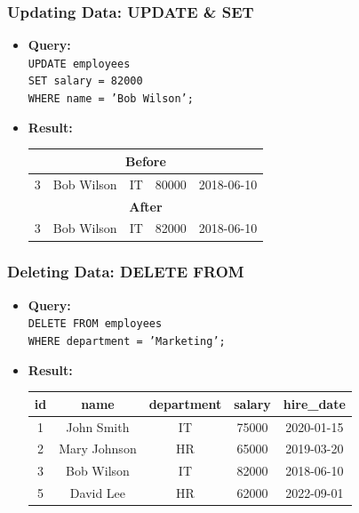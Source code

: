 \documentclass[10pt]{beamer}
\begin{document}
\begin{frame}[fragile]
  \frametitle{Updating Data: UPDATE \& SET}
  \begin{itemize}
    \item \textbf{Query:} \\
    \texttt{UPDATE employees} \\
    \texttt{SET salary = 82000} \\
    \texttt{WHERE name = 'Bob Wilson';}
    
    \item \textbf{Result:}
    \begin{center}
      \begin{tabular}{|c|c|c|c|c|}
        \hline
        \multicolumn{5}{|c|}{\textbf{Before}} \\
        \hline
        3 & Bob Wilson & IT & 80000 & 2018-06-10 \\
        \hline
        \multicolumn{5}{|c|}{\textbf{After}} \\
        \hline
        3 & Bob Wilson & IT & 82000 & 2018-06-10 \\
        \hline
      \end{tabular}
    \end{center}
  \end{itemize}
\end{frame}

\begin{frame}[fragile]
  \frametitle{Deleting Data: DELETE FROM}
  \begin{itemize}
    \item \textbf{Query:} \\
    \texttt{DELETE FROM employees} \\
    \texttt{WHERE department = 'Marketing';}
    
    \item \textbf{Result:}
    \begin{center}
      \begin{tabular}{|c|c|c|c|c|}
        \hline
        \textbf{id} & \textbf{name} & \textbf{department} & \textbf{salary} & \textbf{hire\_date} \\
        \hline
        1 & John Smith & IT & 75000 & 2020-01-15 \\
        2 & Mary Johnson & HR & 65000 & 2019-03-20 \\
        3 & Bob Wilson & IT & 82000 & 2018-06-10 \\
        5 & David Lee & HR & 62000 & 2022-09-01 \\
        \hline
      \end{tabular}
    \end{center}
  \end{itemize}
\end{frame}
\end{document}
